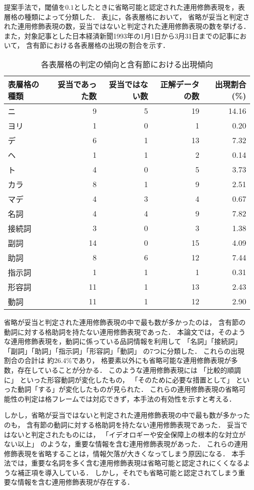 提案手法で，閾値を$0.1$としたときに省略可能と認定された連用修飾表現を，表層格の種類によって分類した．
表\ref{result_main}に，各表層格において，
省略が妥当と判定された連用修飾表現の数，妥当ではないと判定された連用修飾表現の数を挙げる．
また，対象記事とした日本経済新聞1993年の1月1日から3月31日までの記事において，
含有節における各表層格の出現の割合を示す．
\begin{table}[bt]
\begin{center}
\caption{各表層格の判定の傾向と含有節における出現傾向} \label{result_main}
\begin{tabular}{l|r|r|r|r}
\hline
 表層格の種類 & 妥当であった数 & 妥当ではない数 & 正解データの数 & 出現割合(\%)\\
\hline \hline
ニ & 9 & 5 & 19 & 14.16\\
ヨリ & 1 & 0 & 1 & 0.20\\
デ & 6 & 1 & 13 & 7.32\\
ヘ & 1 & 1 & 2 & 0.14\\
ト & 4 & 0 & 5 & 3.73\\
カラ & 8 & 1 & 9 & 2.51\\
マデ & 4 & 3 & 4 & 0.67\\ \hline
名詞 & 4 & 4 & 9 & 7.82\\
接続詞 & 3 & 0 & 3 & 1.38\\
副詞 & 14 & 0 & 15 & 4.09\\
助詞 & 8 & 6 & 12 & 7.44\\
指示詞 & 1 & 1 & 1 & 0.31\\
形容詞 & 11 & 1 & 13 & 2.43\\
動詞 & 11 & 1 & 12 & 2.90\\
\hline
\end{tabular}
\end{center}
\end{table}
省略が妥当と判定された連用修飾表現の中で最も数が多かったのは，
含有節の動詞に対する格助詞を持たない連用修飾表現であった．
本論文では，そのような連用修飾表現を，動詞に係っている品詞情報を利用して
「名詞」「接続詞」「副詞」「助詞」「指示詞」「形容詞」「動詞」
の7つに分類した．
これらの出現割合の合計は
約26.4\%であり，
格要素以外にも省略可能な連用修飾表現が多数，存在していることが分かる．
このような連用修飾表現には
「比較的順調に」
といった形容動詞が変化したもの，
「そのために必要な措置として」
といった動詞「する」が変化したものが見られた．
これらの連用修飾表現の省略可能性の判定は格フレームでは対応できず，本手法の有効性を示すと考える．

しかし，省略が妥当ではないと判定された連用修飾表現の中で最も数が多かったのも，
含有節の動詞に対する格助詞を持たない連用修飾表現であった．
妥当ではないと判定されたものには，
「イデオロギーや安全保障上の根本的な対立がない以上」
のような，重要な情報を含む連用修飾表現があった．
これらの連用修飾表現を省略することは，情報欠落が大きくなってしまう原因になる．
本手法では，重要な名詞を多く含む連用修飾表現は省略可能と認定されにくくなるような補正項を導入している．
しかし，それでも省略可能と認定されてしまう重要な情報を含む連用修飾表現が存在する．


